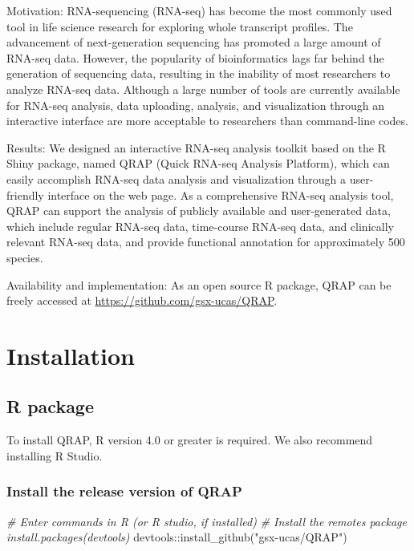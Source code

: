 \documentclass[
  a4paper,
  oneside]{book}
\newenvironment{Shaded}{\begin{snugshade}}{\end{snugshade}}
\newcommand{\CommentTok}[1]{\textcolor[rgb]{0.56,0.35,0.01}{\textit{#1}}}
\newcommand{\FunctionTok}[1]{\textcolor[rgb]{0.00,0.00,0.00}{#1}}
\newcommand{\NormalTok}[1]{#1}
\newcommand{\SpecialCharTok}[1]{\textcolor[rgb]{0.00,0.00,0.00}{#1}}
\newcommand{\StringTok}[1]{\textcolor[rgb]{0.31,0.60,0.02}{#1}}
\begin{document}
Motivation: RNA-sequencing (RNA-seq) has become the most commonly used tool in life science research for exploring whole transcript profiles. The advancement of next-generation sequencing has promoted a large amount of RNA-seq data. However, the popularity of bioinformatics lags far behind the generation of sequencing data, resulting in the inability of most researchers to analyze RNA-seq data. Although a large number of tools are currently available for RNA-seq analysis, data uploading, analysis, and visualization through an interactive interface are more acceptable to researchers than command-line codes.

Results: We designed an interactive RNA-seq analysis toolkit based on the R Shiny package, named QRAP (Quick RNA-seq Analysis Platform), which can easily accomplish RNA-seq data analysis and visualization through a user-friendly interface on the web page. As a comprehensive RNA-seq analysis tool, QRAP can support the analysis of publicly available and user-generated data, which include regular RNA-seq data, time-course RNA-seq data, and clinically relevant RNA-seq data, and provide functional annotation for approximately 500 species.

Availability and implementation: As an open source R package, QRAP can be freely accessed at \url{https://github.com/gsx-ucas/QRAP}.

\hypertarget{installation}{%
\section{Installation}\label{installation}}

\hypertarget{r-package}{%
\subsection{R package}\label{r-package}}

To install QRAP, R version 4.0 or greater is required. We also recommend installing R Studio.\\

\hypertarget{install-the-release-version-of-qrap}{%
\subsubsection{Install the release version of QRAP}\label{install-the-release-version-of-qrap}}

\begin{Shaded}
\begin{Highlighting}[]
\CommentTok{\# Enter commands in R (or R studio, if installed) }
\CommentTok{\# Install the remotes package install.packages(\textquotesingle{}devtools\textquotesingle{}) }
\NormalTok{devtools}\SpecialCharTok{::}\FunctionTok{install\_github}\NormalTok{(}\StringTok{"gsx{-}ucas/QRAP"}\NormalTok{)}
\end{Highlighting}
\end{Shaded}
\end{document}
